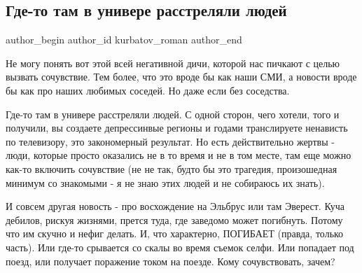  
 
 
 
 
 
\subsection{Где-то там в универе расстреляли людей}
\label{sec:24_09_2021.fb.kurbatov_roman.1.rasstrel_permj}
 
\ifcmt
 author_begin
   author_id kurbatov_roman
 author_end
\fi

Не могу понять вот этой всей негативной дичи, которой нас пичкают с целью
вызвать сочувствие. Тем более, что это вроде бы как наши СМИ, а новости вроде
бы как про наших любимых соседей. Но даже если без соседства.

Где-то там в универе расстреляли людей. С одной сторон, чего хотели, того и
получили, вы создаете депрессинвые регионы и годами транслируете ненависть по
телевизору, это закономерный результат. Но есть действительно жертвы - люди,
которые просто оказались не в то время и не в том месте, там еще можно как-то
включить сочувствие (не не так, будто бы это трагедия, произошедная минимум со
знакомыми - я не знаю этих людей и не собираюсь их знать).

И совсем другая новость - про восхождение на Эльбрус или там Эверест. Куча
дебилов, рискуя жизнями, прется туда, где заведомо может погибнуть. Потому что
им скучно и нефиг делать. И, что характерно, ПОГИБАЕТ (правда, только часть).
Или где-то срывается со скалы во время съемок селфи. Или попадает под поезд,
или получает поражение током на поезде. Кому сочувствовать, зачем?
